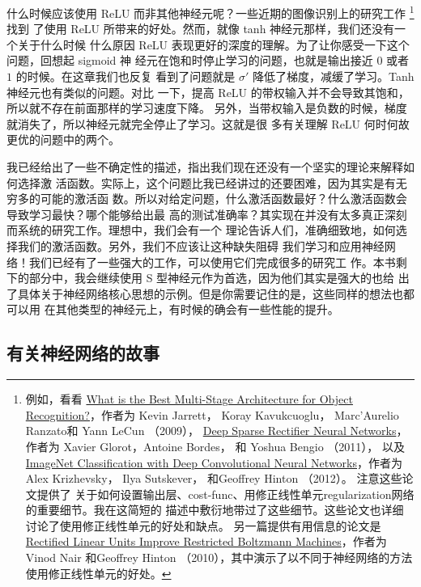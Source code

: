 什么时候应该使用 ReLU 而非其他神经元呢？一些近期的图像识别上的研究工作
\footnote{例如，看看
  \href{http://yann.lecun.com/exdb/publis/pdf/jarrett-iccv-09.pdf}{What is the
    Best Multi-Stage Architecture for Object Recognition?}，作者为 Kevin Jarrett，
  Koray Kavukcuoglu， Marc'Aurelio Ranzato和 Yann LeCun （2009），
  \href{http://www.jmlr.org/proceedings/papers/v15/glorot11a.html}{Deep Sparse
    Rectiﬁer Neural Networks}，作者为 Xavier Glorot，Antoine Bordes， 和 Yoshua
  Bengio （2011）， 以及
  \href{https://papers.nips.cc/paper/4824-imagenet-classification-with-deep-convolutional-neural-networks.pdf}{ImageNet
    Classification with Deep Convolutional Neural Networks}，作者为 Alex
  Krizhevsky， Ilya Sutskever， 和Geoffrey Hinton （2012）。 注意这些论文提供了
  关于如何设置输出层、\gls*{cost-func}、用修正线性单元\gls*{regularization}网络的重要细节。我在这简短的
  描述中敷衍地带过了这些细节。这些论文也详细讨论了使用修正线性单元的好处和缺点。
  另一篇提供有用信息的论文是
  \href{https://www.cs.toronto.edu/~hinton/absps/reluICML.pdf}{Rectified Linear
    Units Improve Restricted Boltzmann Machines}，作者为 Vinod Nair 和Geoffrey
  Hinton （2010），其中演示了以不同于神经网络的方法使用修正线性单元的好处。}找到
了使用 ReLU 所带来的好处。然而，就像 tanh 神经元那样，我们还没有一个关于什么时候
什么原因 ReLU 表现更好的深度的理解。为了让你感受一下这个问题，回想起 sigmoid 神
经元在饱和时停止学习的问题，也就是输出接近 $0$ 或者 $1$ 的时候。在这章我们也反复
看到了问题就是 $\sigma'$ 降低了梯度，减缓了学习。Tanh 神经元也有类似的问题。对比
一下，提高 ReLU 的带权输入并不会导致其饱和，所以就不存在前面那样的学习速度下降。
另外，当带权输入是负数的时候，梯度就消失了，所以神经元就完全停止了学习。这就是很
多有关理解 ReLU 何时何故更优的问题中的两个。

我已经给出了一些不确定性的描述，指出我们现在还没有一个坚实的理论来解释如何选择激
活函数。实际上，这个问题比我已经讲过的还要困难，因为其实是有无穷多的可能的激活函
数。所以对给定问题，什么激活函数最好？什么激活函数会导致学习最快？哪个能够给出最
高的测试准确率？其实现在并没有太多真正深刻而系统的研究工作。理想中，我们会有一个
理论告诉人们，准确细致地，如何选择我们的激活函数。另外，我们不应该让这种缺失阻碍
我们学习和应用神经网络！我们已经有了一些强大的工作，可以使用它们完成很多的研究工
作。本书剩下的部分中，我会继续使用 S 型神经元作为首选，因为他们其实是强大的也给
出了具体关于神经网络核心思想的示例。但是你需要记住的是，这些同样的想法也都可以用
在其他类型的神经元上，有时候的确会有一些性能的提升。

\subsection{有关神经网络的故事}

